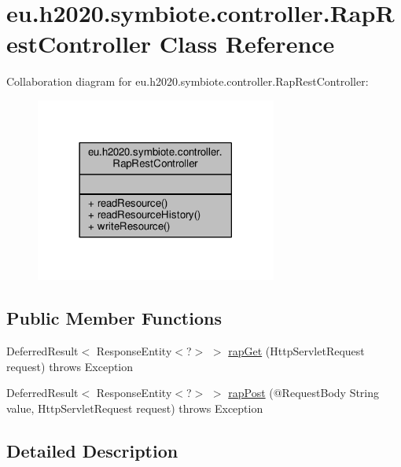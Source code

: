 \hypertarget{classeu_1_1h2020_1_1symbiote_1_1controller_1_1RapRestController}{}\section{eu.\+h2020.\+symbiote.\+controller.\+Rap\+Rest\+Controller Class Reference}
\label{classeu_1_1h2020_1_1symbiote_1_1controller_1_1RapRestController}


Collaboration diagram for eu.\+h2020.\+symbiote.\+controller.\+Rap\+Rest\+Controller\+:\nopagebreak
\begin{figure}[H]
\begin{center}
\leavevmode
\includegraphics[width=225pt]{classeu_1_1h2020_1_1symbiote_1_1controller_1_1RapRestController__coll__graph}
\end{center}
\end{figure}
\subsection*{Public Member Functions}
\begin{DoxyCompactItemize}
\item 
Deferred\+Result$<$ Response\+Entity$<$?$>$ $>$ \hyperlink{classeu_1_1h2020_1_1symbiote_1_1controller_1_1RapRestController_a505d4e7b0a63caeb4343679149422b26}{rap\+Get} (Http\+Servlet\+Request request)  throws Exception 
\item 
Deferred\+Result$<$ Response\+Entity$<$?$>$ $>$ \hyperlink{classeu_1_1h2020_1_1symbiote_1_1controller_1_1RapRestController_a6c012c973b8b6500acc7c638a53b45a1}{rap\+Post} (@Request\+Body String value, Http\+Servlet\+Request request)  throws Exception 
\end{DoxyCompactItemize}


\subsection{Detailed Description}
